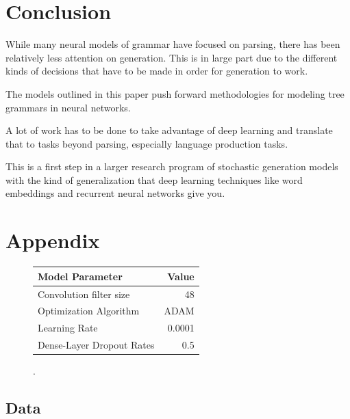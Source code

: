 \documentclass[11pt]{article}
\begin{document}
\section{Conclusion}
\label{sec:conclusion}

While many neural models of grammar have focused on parsing, there has been relatively less attention on generation.
%
This is in large part due to the different kinds of decisions that have to be made in order for generation to work. 


The models outlined in this paper push forward methodologies for modeling tree grammars in neural networks. 


A lot of work has to be done to take advantage of deep learning and translate that to tasks beyond parsing, especially language production tasks.

This is a first step in a larger research program of stochastic generation models with the kind of generalization that deep learning techniques like word embeddings and recurrent neural networks give you. 







\newpage
\appendix

\section{Appendix}


\begin{figure}
\centering
\begin{tabular}{|p{6cm}|r|}
\hline
Model Parameter & Value \\ \hline
Convolution filter size & 48 \\ \hline
Optimization Algorithm & ADAM \\ \hline
Learning Rate & 0.0001 \\ \hline
Dense-Layer Dropout Rates & 0.5 \\ \hline
\end{tabular}
\label{table:params}
\caption{.}
\end{figure}

\subsection{Data}
\end{document}
